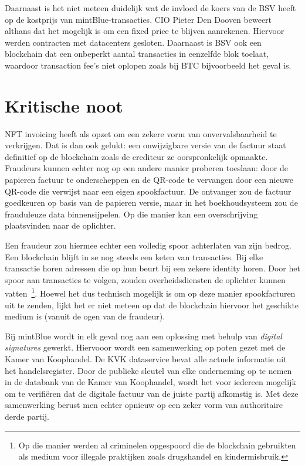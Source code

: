 Daarnaast is het niet meteen duidelijk wat de invloed de koers van de BSV heeft op de kostprijs van mintBlue-transacties. CIO Pieter Den Dooven beweert althans dat het mogelijk is om een fixed price te blijven aanrekenen. Hiervoor werden contracten met datacenters gesloten. Daarnaast is BSV ook een blockchain dat een onbeperkt aantal transacties in eenzelfde blok toelaat, waardoor transaction fee's niet oplopen zoals bij BTC bijvoorbeeld het geval is.


\section{Kritische noot}
\label{sec:kritische-noot}

NFT invoicing heeft als opzet om een zekere vorm van onvervalsbaarheid te verkrijgen. Dat is dan ook gelukt: een onwijzigbare versie van de factuur staat definitief op de blockchain zoals de crediteur ze oorspronkelijk opmaakte. Fraudeurs kunnen echter nog op een andere manier proberen toeslaan: door de papieren factuur te onderscheppen en de QR-code te vervangen door een nieuwe QR-code die verwijst naar een eigen spookfactuur. De ontvanger zou de factuur goedkeuren op basis van de papieren versie, maar in het boekhoudsysteem zou de frauduleuze data binnensijpelen. Op die manier kan een overschrijving plaatsvinden naar de oplichter.

Een fraudeur zou hiermee echter een volledig spoor achterlaten van zijn bedrog. Een blockchain blijft in se nog steeds een keten van transacties. Bij elke transactie horen adressen die op hun beurt bij een zekere identity horen. Door het spoor aan transacties te volgen, zouden overheidsdiensten de oplichter kunnen vatten~\footnote{Op die manier werden al criminelen opgespoord die de blockchain gebruikten als medium voor illegale praktijken zoals drugshandel en kindermisbruik.}. Hoewel het dus technisch mogelijk is om op deze manier spookfacturen uit te zenden, lijkt het er niet meteen op dat de blockchain hiervoor het geschikte medium is (vanuit de ogen van de fraudeur).

Bij mintBlue wordt in elk geval nog aan een oplossing met behulp van \textit{digital signatures} gewerkt. Hiervooor wordt een samenwerking op poten gezet met de Kamer van Koophandel. De KVK dataservice bevat alle actuele informatie uit het handelsregister. Door de publieke sleutel van elke onderneming op te nemen in de databank van de Kamer van Koophandel, wordt het voor iedereen mogelijk om te verifiëren dat de digitale factuur van de juiste partij afkomstig is. Met deze samenwerking berust men echter opnieuw op een zeker vorm van authoritaire derde partij. 




